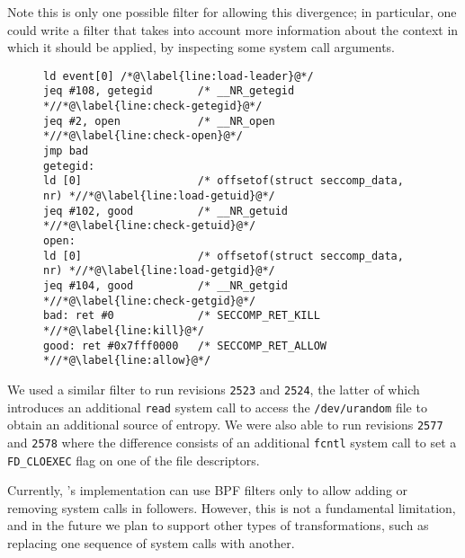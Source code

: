 Note this is only one possible filter for allowing this divergence; in
particular, one could write a filter that takes into account more
information about the context in which it should be applied, \eg by
inspecting some system call arguments.


\begin{figure}[t]
\begin{center}
\begin{lstlisting}[label={lst:lighttpd},language={[bpf]Assembler},caption={Example of a BPF rewriting rule.}]
ld event[0] /*@\label{line:load-leader}@*/
jeq #108, getegid       /* __NR_getegid *//*@\label{line:check-getegid}@*/
jeq #2, open            /* __NR_open *//*@\label{line:check-open}@*/
jmp bad
getegid:
ld [0]                  /* offsetof(struct seccomp_data, nr) *//*@\label{line:load-getuid}@*/
jeq #102, good          /* __NR_getuid *//*@\label{line:check-getuid}@*/
open:
ld [0]                  /* offsetof(struct seccomp_data, nr) *//*@\label{line:load-getgid}@*/
jeq #104, good          /* __NR_getgid *//*@\label{line:check-getgid}@*/
bad: ret #0             /* SECCOMP_RET_KILL *//*@\label{line:kill}@*/
good: ret #0x7fff0000   /* SECCOMP_RET_ALLOW *//*@\label{line:allow}@*/
\end{lstlisting}
\end{center}
\end{figure}



We used a similar filter to run revisions \lstinline`2523` and
\lstinline`2524`, the latter of which introduces an additional
\lstinline`read` system call to access the \lstinline`/dev/urandom`
file to obtain an additional source of entropy.  We were also able to
run revisions \lstinline`2577` and \lstinline`2578` where the
difference consists of an additional \lstinline`fcntl` system call to
set a \lstinline`FD_CLOEXEC` flag on one of the file descriptors.

Currently, \varan's implementation can use BPF filters only to allow adding
or removing system calls in followers.  However, this is not a
fundamental limitation, and in the future we plan
to support  other types of transformations, such as replacing one
sequence of system calls with another.


